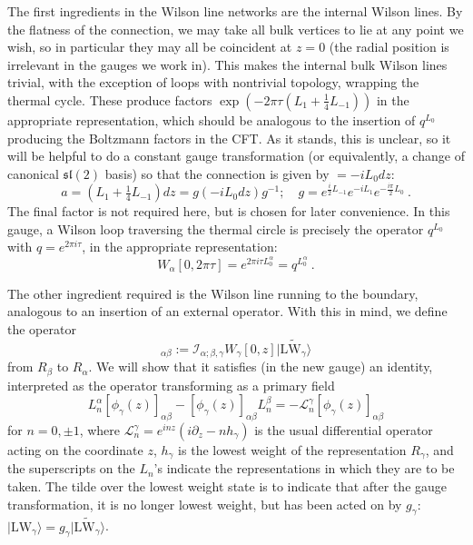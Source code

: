 \documentclass[12pt]{article}
\newcommand{\lie}[1]{\mathfrak{#1}}
\newcommand{\intertwine}[3]{\mathcal{I}_{#1;#2,#3}}
\newcommand{\lw}[1]{|\text{LW}_{#1}\rangle}
\begin{document}
The first ingredients in the Wilson line networks are the internal Wilson lines. By the flatness of the connection, we may take all bulk vertices to lie at any point we wish, so in particular they may all be coincident at $z=0$ (the radial position is irrelevant in the gauges we work in). This makes the internal bulk Wilson lines trivial, with the exception of loops with nontrivial topology, wrapping the thermal cycle. These produce factors $\exp\left(-2\pi\tau \left(L_1 +\frac{1}{4}L_{-1}\right)\right)$ in the appropriate representation, which should be analogous to the insertion of $q^{L_0}$ producing the Boltzmann factors in the CFT. As it stands, this is unclear, so it will be helpful to do a constant gauge transformation (or equivalently, a change of canonical $\lie{sl}(2)$ basis) so that the connection is given by $=-i L_0 dz$:
\begin{equation}
	a= \left(L_1+\tfrac{1}{4}L_{-1}\right)dz = g \left(-i L_0 dz\right) g^{-1};\quad g=e^{\frac{i}{2}L_{-1}}e^{-iL_1}e^{-\frac{i\pi}{2}L_0}~.
\end{equation}
The final factor is not required here, but is chosen for later convenience. In this gauge, a Wilson loop traversing the thermal circle is precisely the operator $q^{L_0}$ with $q=e^{2\pi i \tau}$, in the appropriate representation:
\begin{equation}
	W_\alpha[0,2\pi\tau] = e^{2\pi i \tau L_0^\alpha}=q^{L_0^\alpha}~.
\end{equation}

The other ingredient required is the Wilson line running to the boundary, analogous to an insertion of an external operator. With this in mind, we define the operator
\begin{equation}
	[\phi_\gamma(z)]_{\alpha\beta} := \intertwine{\alpha}{\beta}{\gamma}W_\gamma[0,z] \widetilde{\lw{\gamma}}
\end{equation}
from $R_\beta$ to $R_\alpha$. We will show that it satisfies (in the new gauge) an identity, interpreted as the operator transforming as a primary field
\begin{equation}\label{phidentity}
	L_n^\alpha [\phi_\gamma(z)]_{\alpha\beta}-[\phi_\gamma(z)]_{\alpha\beta}L_n^\beta = -\mathcal{L}^\gamma_n[\phi_\gamma(z)]_{\alpha\beta}
\end{equation}
for $n=0,\pm 1$, where $\mathcal{L}^\gamma_n=e^{inz}(i\partial_z-nh_\gamma)$ is the usual differential operator acting on the coordinate $z$, $h_\gamma$ is the lowest weight of the representation $R_\gamma$, and the superscripts on the $L_n$'s indicate the representations in which they are to be taken. The tilde over the lowest weight state is to indicate that after the gauge transformation, it is no longer lowest weight, but has been acted on by $g_\gamma$: $\lw{\gamma}=g_\gamma\widetilde{\lw{\gamma}}$.
\end{document}
